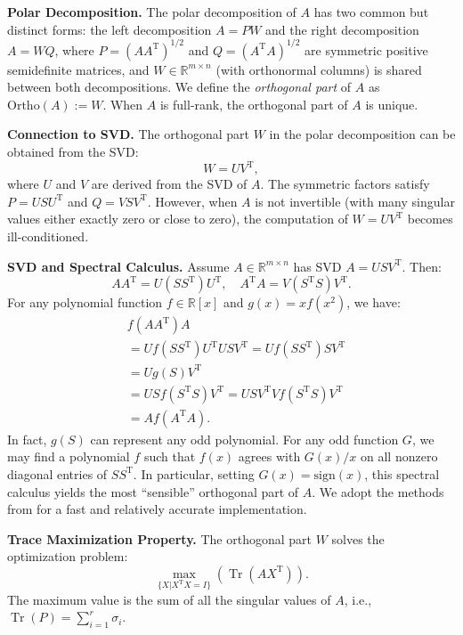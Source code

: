 \documentclass{article} %
\newcommand{\R}{\mathbb{R}}
\DeclareMathOperator{\Tr}{Tr}
\begin{document}
\textbf{Polar Decomposition.} The polar decomposition of \(A\) has two common but distinct forms: 
the left decomposition \( A = PW \) and the right decomposition \( A = WQ \),
where \( P = (AA^{\text{T}})^{1/2} \) and \( Q = (A^{\text{T}}A)^{1/2} \) are symmetric positive semidefinite matrices,
and \( W \in \R^{m \times n} \) (with orthonormal columns) is shared between both decompositions.
We define the \textit{orthogonal part} of \(A\) as \(\mathrm{Ortho}(A) := W\). 
When \(A\) is full-rank, the orthogonal part of \(A\) is unique.

\textbf{Connection to SVD.} The orthogonal part \(W\) in the polar decomposition can be obtained from the SVD:
\[
W = U V^{\text{T}},
\]
where \(U\) and \(V\) are derived from the SVD of \(A\).
The symmetric factors satisfy \( P = U S U^{\text{T}} \) and \( Q = V S V^{\text{T}} \).
However, when \(A\) is not invertible (with many singular values either exactly zero or close to zero), the computation of \(W = U V^{\text{T}}\) becomes ill-conditioned.

\textbf{SVD and Spectral Calculus.} Assume \(A \in \R^{m \times n}\) has SVD \(A = U S V^{\text{T}}\). Then:
\[
AA^{\text{T}} = U (SS^{\text{T}}) U^{\text{T}}, \quad A^{\text{T}}A = V (S^{\text{T}} S) V^{\text{T}}.
\]
For any polynomial function \(f \in \R[x]\) and \(g(x) = x f(x^2)\), we have:
\[
\begin{aligned}
    & f(AA^{\text{T}})A \\
    &= U f(SS^{\text{T}}) U^{\text{T}} U S V^{\text{T}} = U f(SS^{\text{T}}) S V^{\text{T}} \\
    &= U g(S) V^{\text{T}} \\
    &= U S f(S^{\text{T}} S) V^{\text{T}} = U S V^{\text{T}} V f(S^{\text{T}} S) V^{\text{T}} \\
    &= A f(A^{\text{T}} A).
\end{aligned}
\]
In fact, \(g(S)\) can represent any odd polynomial. For any odd function \(G\), we may find a polynomial \(f\) such that \(f(x)\) agrees with \(G(x)/x\) on all nonzero diagonal entries of \(SS^{\text{T}}\).  
In particular, setting \(G(x) = \mathrm{sign}(x)\), this spectral calculus yields the most ``sensible'' orthogonal part of \(A\).  
We adopt the methods from \citet{amsel2025polarexpressoptimalmatrix} for a fast and relatively accurate implementation.

\textbf{Trace Maximization Property.} The orthogonal part \(W\) solves the optimization problem:
\[
\max_{\{ X | X^{\text{T}} X = I \}} \left( \Tr(A X^{\text{T}}) \right).
\]
The maximum value is the sum of all the singular values of \(A\), i.e., \(\Tr(P) = \sum_{i=1}^r \sigma_i\).
\end{document}
